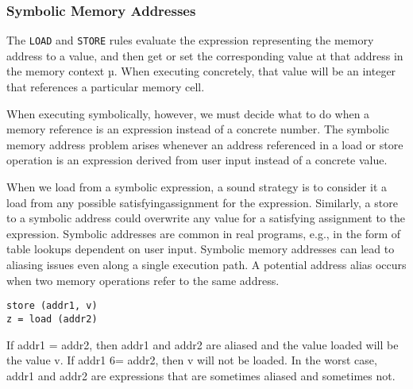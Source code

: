 \subsubsection{Symbolic Memory Addresses}
The \texttt{LOAD} and \texttt{STORE} rules evaluate the expression representing the memory address to a value, and then get or set the corresponding value at that address in the memory context µ. When executing concretely, that value will be an integer that references a particular memory cell.

When executing symbolically, however, we must decide what to do when a memory reference is an expression instead of a concrete number. The symbolic memory address problem arises whenever an address referenced in a load or store operation is an expression derived from user input instead of a concrete value.

When we load from a symbolic expression, a sound strategy is to consider it a load from any possible satisfyingassignment for the expression. Similarly, a store to a symbolic address could overwrite any value for a satisfying assignment to the expression. Symbolic addresses are common in real programs, e.g., in the form of table lookups dependent on user input. Symbolic memory addresses can lead to aliasing issues even along a single execution path. A potential address alias occurs when two memory operations refer to the same address.

\begin{lstlisting}
store (addr1, v) 
z = load (addr2)
\end{lstlisting}

If addr1 = addr2, then addr1 and addr2 are aliased and the value loaded will be the value v. If addr1 6= addr2, then v will not be loaded. In the worst case, addr1 and addr2 are expressions that are sometimes aliased and sometimes not.